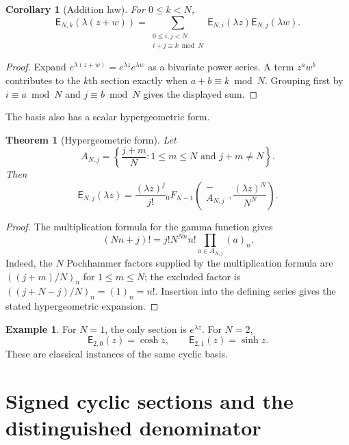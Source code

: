 \documentclass[11pt,letterpaper]{article}
\newtheorem{theorem}{Theorem}[section]
\newtheorem{corollary}[corollary]{Corollary}
\theoremstyle{definition}
\newtheorem{example}[example]{Example}
\theoremstyle{remark}
\newcommand{\Efun}{\mathsf E}
\begin{document}
\begin{corollary}[Addition law]\label{cor:exponential_addition}
For $0\leq k<N$,
\[
\Efun_{N,k}(\lambda(z+w))
=
\sum_{\substack{0\leq i,j<N\\ i+j\equiv k\bmod N}}
\Efun_{N,i}(\lambda z)\Efun_{N,j}(\lambda w).
\]
\end{corollary}

\begin{proof}
Expand $e^{\lambda(z+w)}=e^{\lambda z}e^{\lambda w}$ as a
bivariate power series.  A term $z^a w^b$ contributes to the
$k$th section exactly when $a+b\equiv k\bmod N$.  Grouping first by
$i\equiv a\bmod N$ and $j\equiv b\bmod N$ gives the displayed sum.
\end{proof}

The basis also has a scalar hypergeometric form.

\begin{theorem}[Hypergeometric form]\label{thm:hypergeometric_form}
Let
\[
A_{N,j}
=
\left\{
\frac{j+m}{N}
\mathrel{:}
1\leq m\leq N
\text{ and }
j+m\ne N
\right\}.
\]
Then
\[
\Efun_{N,j}(\lambda z)
=
\frac{(\lambda z)^j}{j!}
{}_0F_{N-1}
\left(
\begin{matrix}-\\ A_{N,j}\end{matrix}
\mathrel{,}
\frac{(\lambda z)^N}{N^N}
\right).
\]
\end{theorem}

\begin{proof}
The multiplication formula for the gamma function gives
\[
(Nn+j)!
=
j!N^{Nn}n!
\prod_{a\in A_{N,j}}(a)_n.
\]
Indeed, the $N$ Pochhammer factors supplied by the multiplication formula
are $((j+m)/N)_n$ for $1\leq m\leq N$; the excluded factor is
$((j+N-j)/N)_n=(1)_n=n!$.
Insertion into the defining series gives the stated hypergeometric expansion.
\end{proof}

\begin{example}\label{ex:classical_exponential}
For $N=1$, the only section is $e^{\lambda z}$.  For $N=2$,
\[
\Efun_{2,0}(z)=\cosh z,
\qquad
\Efun_{2,1}(z)=\sinh z.
\]
These are classical instances of the same cyclic basis.
\end{example}

\section{Signed cyclic sections and the distinguished denominator}\label{sec:signed_system}
\end{document}
